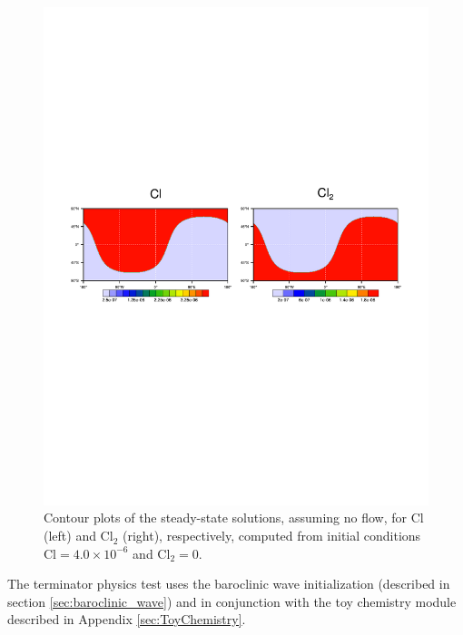 \documentclass[times,doublespace]{fldauth}
\begin{document}
\begin{figure}[tb]
\center\includegraphics[width=\linewidth]{terminator_cl_init.pdf}
  \caption{Contour plots of the steady-state solutions, assuming no flow, for Cl (left) and Cl$_2$ (right), respectively, computed from initial conditions $\mathrm{Cl}=4.0\times 10^{-6}$ and $\mathrm{Cl}_2=0$.}\label{fig:terminator_cl_init.pdf}
\end{figure} 


The terminator physics test uses the baroclinic wave initialization (described in section \ref{sec:baroclinic_wave}) and in conjunction with the toy chemistry module described in Appendix \ref{sec:ToyChemistry}.



\cite{LCLVT2015GMD}
%
\end{document}
